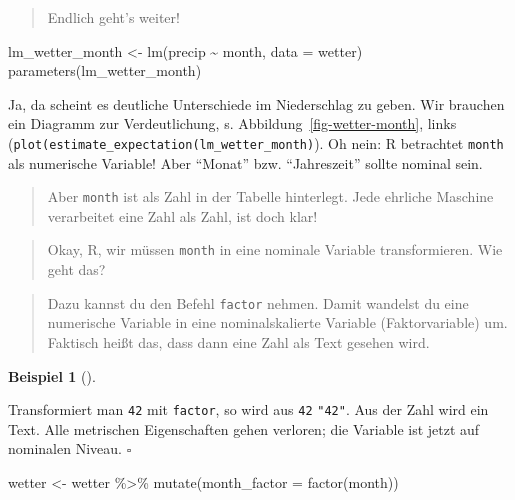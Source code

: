 \documentclass[
  letterpaper,
  twoside,
  open=any]{scrbook}
\newenvironment{Shaded}{\begin{snugshade}}{\end{snugshade}}
\newcommand{\AttributeTok}[1]{\textcolor[rgb]{0.40,0.45,0.13}{#1}}
\newcommand{\FunctionTok}[1]{\textcolor[rgb]{0.28,0.35,0.67}{#1}}
\newcommand{\NormalTok}[1]{\textcolor[rgb]{0.00,0.23,0.31}{#1}}
\newcommand{\OtherTok}[1]{\textcolor[rgb]{0.00,0.23,0.31}{#1}}
\newcommand{\SpecialCharTok}[1]{\textcolor[rgb]{0.37,0.37,0.37}{#1}}
\theoremstyle{definition}
\theoremstyle{definition}
\newtheorem{example}{Beispiel}[chapter]
\theoremstyle{definition}
\theoremstyle{remark}
\begin{document}
\begin{quote}
{} Endlich geht's weiter!
\end{quote}

\begin{Shaded}
\begin{Highlighting}[]
\NormalTok{lm\_wetter\_month }\OtherTok{\textless{}{-}} \FunctionTok{lm}\NormalTok{(precip }\SpecialCharTok{\textasciitilde{}}\NormalTok{ month, }\AttributeTok{data =}\NormalTok{ wetter)}
\FunctionTok{parameters}\NormalTok{(lm\_wetter\_month)}
\end{Highlighting}
\end{Shaded}

Ja, da scheint es deutliche Unterschiede im Niederschlag zu geben. Wir
brauchen ein Diagramm zur Verdeutlichung, s.
Abbildung~\ref{fig-wetter-month}, links
(\texttt{plot(estimate\_expectation(lm\_wetter\_month)}). Oh nein: R
betrachtet \texttt{month} als numerische Variable! Aber \enquote{Monat}
bzw. \enquote{Jahreszeit} sollte nominal sein.

\begin{quote}
{} Aber \texttt{month} ist als Zahl in der Tabelle
hinterlegt. Jede ehrliche Maschine verarbeitet eine Zahl als Zahl, ist
doch klar!
\end{quote}

\begin{quote}
{} Okay, R, wir müssen \texttt{month} in eine nominale
Variable transformieren. Wie geht das?
\end{quote}

\begin{quote}
{} Dazu kannst du den Befehl \texttt{factor} nehmen. Damit
wandelst du eine numerische Variable in eine nominalskalierte Variable
(Faktorvariable) um. Faktisch heißt das, dass dann eine Zahl als Text
gesehen wird.
\end{quote}

\begin{example}[]\protect\hypertarget{exm-factor}{}\label{exm-factor}

Transformiert man \texttt{42} mit \texttt{factor}, so wird aus
\texttt{42} \texttt{"42"}. Aus der Zahl wird ein Text. Alle metrischen
Eigenschaften gehen verloren; die Variable ist jetzt auf nominalen
Niveau. \(\square\)

\end{example}

\begin{Shaded}
\begin{Highlighting}[]
\NormalTok{wetter }\OtherTok{\textless{}{-}}
\NormalTok{  wetter }\SpecialCharTok{\%\textgreater{}\%} 
  \FunctionTok{mutate}\NormalTok{(}\AttributeTok{month\_factor =} \FunctionTok{factor}\NormalTok{(month))}
\end{Highlighting}
\end{Shaded}
\end{document}
